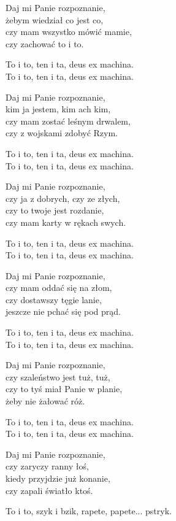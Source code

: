 \begin{text}
    Daj mi Panie rozpoznanie,\\
    żebym wiedział co jest co,\\
    czy mam wszystko mówić mamie,\\
    czy zachować to i to.

    To i to, ten i ta, deus ex machina.\\
    To i to, ten i ta, deus ex machina.

    Daj mi Panie rozpoznanie,\\
    kim ja jestem, kim ach kim,\\
    czy mam zostać leśnym drwalem,\\
    czy z wojskami zdobyć Rzym.

    To i to, ten i ta, deus ex machina.\\
    To i to, ten i ta, deus ex machina.

    Daj mi Panie rozpoznanie,\\
    czy ja z dobrych, czy ze złych,\\
    czy to twoje jest rozdanie,\\
    czy mam karty w rękach swych.

    To i to, ten i ta, deus ex machina.\\
    To i to, ten i ta, deus ex machina.

    Daj mi Panie rozpoznanie,\\
    czy mam oddać się na złom,\\
    czy dostawszy tęgie lanie,\\
    jeszcze nie pchać się pod prąd.

    To i to, ten i ta, deus ex machina.\\
    To i to, ten i ta, deus ex machina.

    Daj mi Panie rozpoznanie,\\
    czy szaleństwo jest tuż, tuż,\\
    czy to tyś miał Panie w planie,\\
    żeby nie żałować róż.

    To i to, ten i ta, deus ex machina.\\
    To i to, ten i ta, deus ex machina.

    Daj mi Panie rozpoznanie,\\
    czy zaryczy ranny łoś,\\
    kiedy przyjdzie już konanie,\\
    czy zapali światło ktoś.

    To i to, szyk i bzik, rapete, papete... pstryk.
\end{text}
\begin{chord}

\end{chord}